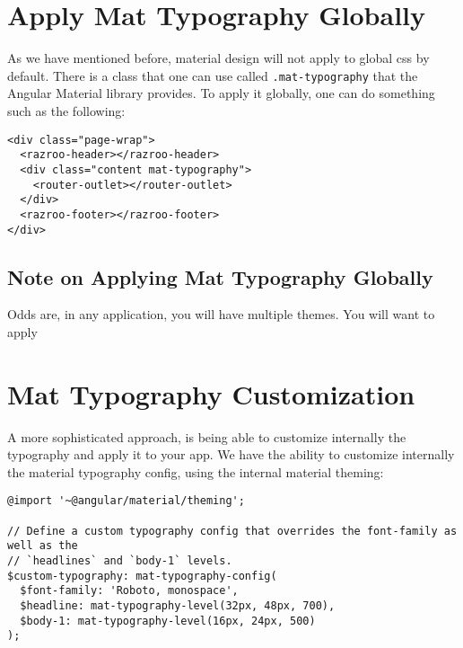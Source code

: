\section{Apply Mat Typography Globally}
As we have mentioned before, material design will not apply to global css by 
default. There is a class that one can use called \lstinline{.mat-typography}
that the Angular Material library provides. To apply it globally, one can do 
something such as the following: 
\begin{lstlisting}[caption=app.component.html]
<div class="page-wrap">
  <razroo-header></razroo-header>
  <div class="content mat-typography">
    <router-outlet></router-outlet>
  </div>
  <razroo-footer></razroo-footer>
</div>
\end{lstlisting}

\subsection{Note on Applying Mat Typography Globally}
Odds are, in any application, you will have multiple themes.
You will want to apply 

\section{Mat Typography Customization}
A more 
sophisticated approach, is being able to customize internally the typography 
and apply it to your app. We have the ability to customize internally the 
material typography config, using the internal material theming: 

\begin{lstlisting}
@import '~@angular/material/theming';

// Define a custom typography config that overrides the font-family as well as the
// `headlines` and `body-1` levels.
$custom-typography: mat-typography-config(
  $font-family: 'Roboto, monospace',
  $headline: mat-typography-level(32px, 48px, 700),
  $body-1: mat-typography-level(16px, 24px, 500)
);
\end{lstlisting}



